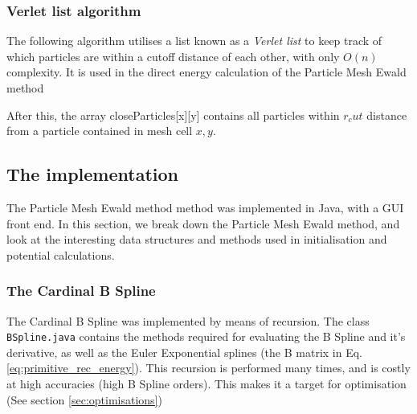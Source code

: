 \documentclass[pdftex,twoside,a4paper]{report}
\newcommand{\pmem}{Particle Mesh Ewald method}
\begin{document}
\subsubsection{Verlet list algorithm}
\label{sec:verlet}
The following algorithm utilises a list known as a \emph{Verlet list} to keep track of which particles are within a cutoff distance of each other, with only $O(n)$ complexity. It is used in the direct energy calculation of the \pmem{}\\
\begin{algorithm}[H]
\SetLine
{}
\end{algorithm}
After this, the array closeParticles[x][y] contains all particles within $r_cut$ distance from a particle contained in mesh cell $x,y$.

\subsection{The implementation}
The \pmem{} method was implemented in Java, with a GUI front end. In this section, we break down the \pmem{}, and look at the interesting data structures and methods used in initialisation and potential calculations.

\subsubsection{The Cardinal B Spline}
The Cardinal B Spline was implemented by means of recursion. The class \texttt{BSpline.java} contains the methods required for evaluating the B Spline and it's derivative, as well as the Euler Exponential splines (the B matrix in Eq. \ref{eq:primitive_rec_energy}). This recursion is performed many times, and is costly at high accuracies (high B Spline orders). This makes it a target for optimisation (See section \ref{sec:optimisations})
\end{document}
